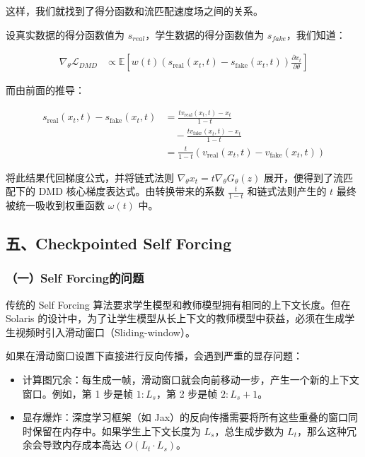 这样，我们就找到了得分函数和流匹配速度场之间的关系。

设真实数据的得分函数值为 \(s_{real}\)，学生数据的得分函数值为 \(s_{fake}\)，我们知道：

\[
\begin{aligned}
\nabla_\theta\mathcal{L}_{DMD}
&\propto
\mathbb{E}\left[
w(t)
\left(s_{\mathrm{real}}(x_t,t)-s_{\mathrm{fake}}(x_t,t)\right)
\frac{\partial x_t}{\partial\theta}
\right]
\end{aligned}
\]

而由前面的推导：

\[
\begin{aligned}
s_{\mathrm{real}}(x_t,t)-s_{\mathrm{fake}}(x_t,t)
&=
\frac{t v_{\mathrm{real}}(x_t,t)-x_t}{1-t}
\\
&\quad-
\frac{t v_{\mathrm{fake}}(x_t,t)-x_t}{1-t}
\\
&=
\frac{t}{1-t}\left(v_{\mathrm{real}}(x_t,t)-v_{\mathrm{fake}}(x_t,t)\right)
\end{aligned}
\]

将此结果代回梯度公式，并将链式法则 \(\nabla_\theta x_t=t\nabla_\theta G_\theta(z)\) 展开，便得到了流匹配下的 DMD 核心梯度表达式。由转换带来的系数 \(\frac{t}{1-t}\) 和链式法则产生的 \(t\) 最终被统一吸收到权重函数 \(\omega(t)\) 中。

\hypertarget{ux4e94checkpointed-self-forcing}{%
\subsection{五、Checkpointed Self Forcing}\label{ux4e94checkpointed-self-forcing}}

\hypertarget{ux4e00self-forcingux7684ux95eeux9898}{%
\subsubsection{（一）Self Forcing的问题}\label{ux4e00self-forcingux7684ux95eeux9898}}

传统的 Self Forcing 算法要求学生模型和教师模型拥有相同的上下文长度。但在 Solaris 的设计中，为了让学生模型从长上下文的教师模型中获益，必须在生成学生视频时引入滑动窗口（Sliding-window）。

如果在滑动窗口设置下直接进行反向传播，会遇到严重的显存问题：

\begin{itemize}
\tightlist
\item
  计算图冗余：每生成一帧，滑动窗口就会向前移动一步，产生一个新的上下文窗口。例如，第 1 步是帧 \(1:L_s\)，第 2 步是帧 \(2:L_s+1\)。
\item
  显存爆炸：深度学习框架（如 Jax）的反向传播需要将所有这些重叠的窗口同时保留在内存中。如果学生上下文长度为 \(L_s\)，总生成步数为 \(L_t\)，那么这种冗余会导致内存成本高达 \(O(L_t\cdot L_s)\)。
\end{itemize}

